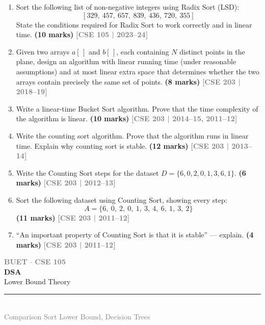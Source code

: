 \documentclass[12pt,a3paper]{article}
\newcommand{\yr}[1]{\hfill\textcolor{gray}{\small\textbf{[#1]}}}
\newcommand{\mk}[1]{\textcolor{orange!70!black}{\small\textbf{(#1 marks)}}}
\newcommand{\secdivider}[4]{%
  \newpage\thispagestyle{empty}%
  \vspace*{\fill}%
  \begin{tcolorbox}[enhanced,colback=#4!7,colframe=#3,boxrule=1.5pt,arc=8pt,
    left=20pt,right=20pt,top=22pt,bottom=22pt,
    shadow={3pt}{-3pt}{0pt}{black!15}]
    \centering
    {\large\textcolor{gray}{\textbf{BUET $\cdot$ CSE 105}}}\\[8pt]
    {\fontsize{26}{32}\selectfont\bfseries\textcolor{#3}{DSA}}\\[6pt]
    {\fontsize{15}{19}\selectfont\textcolor{dgray}{#1}}\\[12pt]
    \textcolor{#3!60}{\rule{0.5\textwidth}{0.5pt}}\\[6pt]
    {\small\textcolor{gray}{#2}}
  \end{tcolorbox}%
  \vspace*{\fill}\newpage%
}
\begin{document}
\begin{enumerate}
\item Sort the following list of non-negative integers using Radix Sort (LSD):
\[ [329,\ 457,\ 657,\ 839,\ 436,\ 720,\ 355] \]
State the conditions required for Radix Sort to work correctly and in linear time. \mk{10}
\yr{CSE 105 | 2023--24}

\item Given two arrays $a[\,]$ and $b[\,]$, each containing $N$ distinct points in the plane, design an algorithm with linear running time (under reasonable assumptions) and at most linear extra space that determines whether the two arrays contain precisely the same set of points. \mk{8}
\yr{CSE 203 | 2018--19}

\item Write a linear-time Bucket Sort algorithm. Prove that the time complexity of the algorithm is linear. \mk{10}
\yr{CSE 203 | 2014--15, 2011--12}

\item Write the counting sort algorithm. Prove that the algorithm runs in linear time. Explain why counting sort is stable. \mk{12}
\yr{CSE 203 | 2013--14}

\item Write the Counting Sort steps for the dataset $D = \{6, 0, 2, 0, 1, 3, 6, 1\}$. \mk{6}
\yr{CSE 203 | 2012--13}

\item Sort the following dataset using Counting Sort, showing every step:
\[ A = \{6,\ 0,\ 2,\ 0,\ 1,\ 3,\ 4,\ 6,\ 1,\ 3,\ 2\} \]
\mk{11}
\yr{CSE 203 | 2011--12}

\item ``An important property of Counting Sort is that it is stable'' --- explain. \mk{4}
\yr{CSE 203 | 2011--12}


\end{enumerate}
\newpage

\secdivider{Lower Bound Theory}{Comparison Sort Lower Bound, Decision Trees}{cG}{cG}
\label{sec:T14}
\end{document}
